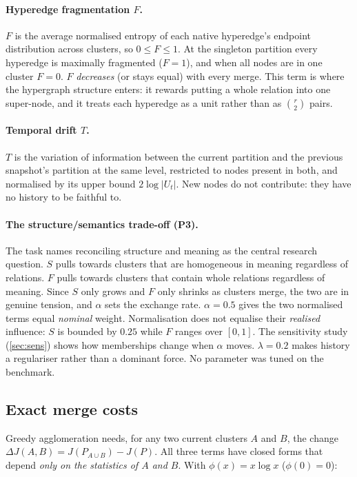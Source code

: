 \documentclass[11pt,a4paper]{article}
\newcommand{\cref}[1]{\autoref{#1}}
\theoremstyle{remark}
\begin{document}
\paragraph{Hyperedge fragmentation $F$.}
$F$ is the average normalised entropy of each native hyperedge's endpoint distribution
across clusters, so $0\le F\le1$. At the singleton partition every hyperedge is
maximally fragmented ($F=1$), and when all nodes are in one cluster $F=0$. $F$
\emph{decreases} (or stays equal) with every merge. This term is where the hypergraph
structure enters: it rewards putting a whole relation into one super-node, and it
treats each hyperedge as a unit rather than as $\binom{r}{2}$ pairs.

\paragraph{Temporal drift $T$.}
$T$ is the variation of information between the current partition and the previous
snapshot's partition at the same level, restricted to nodes present in both, and
normalised by its upper bound $2\log|U_t|$. New nodes do not contribute: they have no
history to be faithful to.

\paragraph{The structure/semantics trade-off (P3).}
The task names reconciling structure and meaning as the central research question.
$S$ pulls towards clusters that are homogeneous in meaning regardless of relations. $F$
pulls towards clusters that contain whole relations regardless of meaning. Since $S$
only grows and $F$ only shrinks as clusters merge, the two are in genuine tension,
and $\alpha$ sets the exchange rate. $\alpha=0.5$ gives the two normalised terms equal
\emph{nominal} weight. Normalisation does not equalise their \emph{realised}
influence: $S$ is bounded by $0.25$ while $F$ ranges over $[0,1]$. The sensitivity
study (\cref{sec:sens}) shows how memberships change when $\alpha$ moves. $\lambda=0.2$
makes history a regulariser rather than a dominant force. No parameter was tuned on
the benchmark.

\subsection{Exact merge costs}
\label{sec:deltas}

Greedy agglomeration needs, for any two current clusters $A$ and $B$, the change
$\Delta J(A,B)=J(P_{A\cup B})-J(P)$. All three terms have closed forms that depend
\emph{only on the statistics of $A$ and $B$}. With $\phi(x)=x\log x$ ($\phi(0)=0$):
\end{document}
